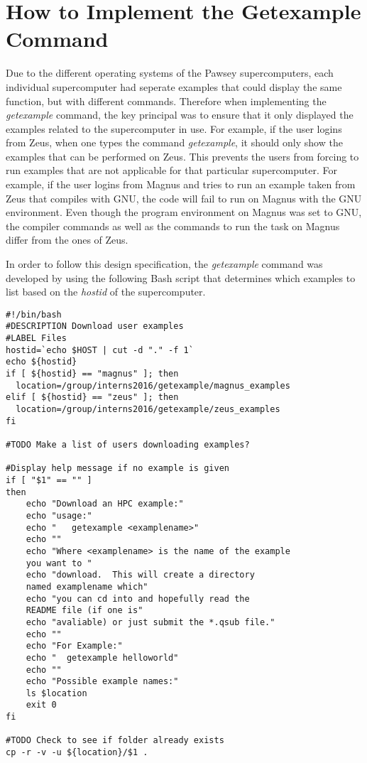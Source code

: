 \section{How to Implement the Getexample Command}

Due to the different operating systems of the Pawsey supercomputers, each individual supercomputer had seperate examples that could display the same
function, but with different commands. Therefore when implementing the \emph{getexample} command, the key principal was to ensure that it only displayed the
examples related to the supercomputer in use. For example, if the user logins from Zeus, when one types the command \emph{getexample}, it should only
show the examples that can be performed on Zeus. This prevents the users from forcing to run examples that are not applicable for that particular 
supercomputer. For example, if the user logins from Magnus and tries to run an example taken from Zeus that compiles with GNU, the code will fail to run
on Magnus with the GNU environment. Even though the program environment on Magnus was set to GNU, the compiler commands as well as the commands to
run the task on Magnus differ from the ones of Zeus.

In order to follow this design specification, the \emph{getexample} command was developed by using the following Bash script that determines which examples to
list based on the \emph{hostid} of the supercomputer.    


\begin{tcolorbox}
\begin{Verbatim}[fontsize=\scriptsize]
#!/bin/bash
#DESCRIPTION Download user examples
#LABEL Files
hostid=`echo $HOST | cut -d "." -f 1`
echo ${hostid}
if [ ${hostid} == "magnus" ]; then 
  location=/group/interns2016/getexample/magnus_examples
elif [ ${hostid} == "zeus" ]; then
  location=/group/interns2016/getexample/zeus_examples
fi

#TODO Make a list of users downloading examples?

#Display help message if no example is given
if [ "$1" == "" ]
then
    echo "Download an HPC example:"
    echo "usage:"
    echo "   getexample <examplename>"
    echo ""
    echo "Where <examplename> is the name of the example 
    you want to "
    echo "download.  This will create a directory 
    named examplename which"
    echo "you can cd into and hopefully read the 
    README file (if one is"
    echo "avaliable) or just submit the *.qsub file."
    echo ""
    echo "For Example:"
    echo "  getexample helloworld"
    echo ""
    echo "Possible example names:"
    ls $location 
    exit 0
fi

#TODO Check to see if folder already exists
cp -r -v -u ${location}/$1 .
\end{Verbatim}
\end{tcolorbox}
